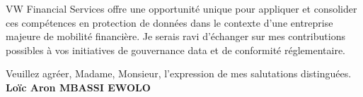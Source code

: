 \documentclass[a4paper,11pt]{article}
\begin{document}
\vspace{0.8em}
\noindent VW Financial Services offre une opportunité unique pour appliquer et consolider ces compétences en protection de données dans le contexte d'une entreprise majeure de mobilité financière. Je serais ravi d'échanger sur mes contributions possibles à vos initiatives de gouvernance data et de conformité réglementaire.

\vspace{1.5em}
\noindent Veuillez agr\'eer, Madame, Monsieur, l'expression de mes salutations distingu\'ees.
\vspace{2em}
\noindent \textbf{Lo\"ic Aron MBASSI EWOLO}
\end{document}
